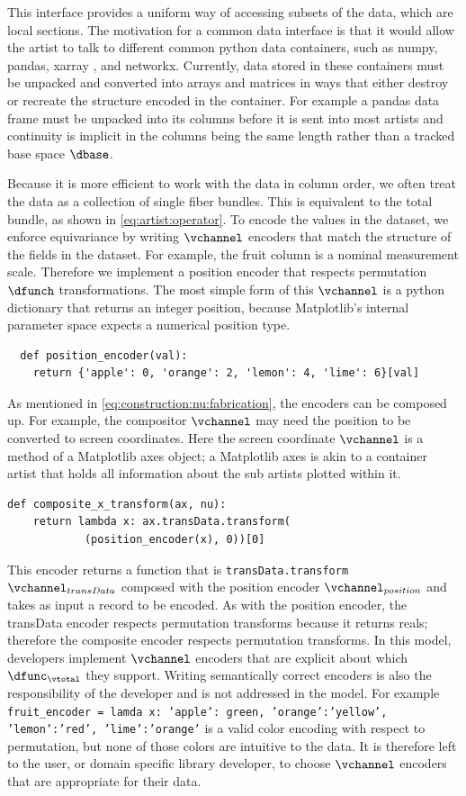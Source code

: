 \documentclass[10pt,journal,compsoc]{IEEEtran}
\theoremstyle{definition}
\theoremstyle{remark}
\begin{document}
This interface provides a uniform way of accessing subsets of the data, which are local sections. The motivation for a common data interface is that it would allow the artist to talk to different common python data containers, such as numpy\cite{harris2020array}, pandas\cite{jeff_reback_2020_3715232}, xarray \cite{hoyer2017xarray}, and networkx\cite{HagbergExploringNetwork2008}. Currently, data stored in these containers must be unpacked and converted into arrays and matrices in ways that either destroy or recreate the structure encoded in the container. For example a pandas data frame must be unpacked into its columns before it is sent into most artists and continuity is implicit in the columns being the same length rather than a tracked base space $\dbase$.

Because it is more efficient to work with the data in column order, we often treat the data as a collection of single fiber bundles. This is equivalent to the total bundle, as shown in \autoref{eq:artist:operator}. To encode the values in the dataset, we enforce equivariance by writing $\vchannel$ encoders that match the structure of the fields in the dataset. For example, the fruit column is a nominal measurement scale. Therefore we implement a position encoder that respects permutation $\dfunch$ transformations. The most simple form of this $\vchannel$ is a python dictionary that returns an integer position, because Matplotlib's internal parameter space expects a numerical position type. 
\begin{verbatim}
  def position_encoder(val):
    return {'apple': 0, 'orange': 2, 'lemon': 4, 'lime': 6}[val]
\end{verbatim}
As mentioned in \autoref{eq:construction:nu:fabrication}, the encoders can be composed up. For example, the compositor $\vchannel$ may need the position to be converted to screen coordinates. Here the screen coordinate $\vchannel$ is a method of a Matplotlib axes object; a Matplotlib axes is akin to a container artist that holds all information about the sub artists plotted within it. 
\begin{verbatim}
def composite_x_transform(ax, nu):
    return lambda x: ax.transData.transform(
            (position_encoder(x), 0))[0]
\end{verbatim}
This encoder returns a function that is \texttt{transData.transform} $\vchannel_{transData}$ composed with the position encoder $\vchannel_{position}$ and takes as input a record to be encoded. As with the position encoder, the transData encoder respects permutation transforms because it returns reals; therefore the composite encoder respects permutation transforms. In this model, developers implement $\vchannel$ encoders that are explicit about which $\dfunc_{\vtotal}$ they support. Writing semantically correct encoders is also the responsibility of the developer and is not addressed in the model. For example \texttt{fruit_encoder = lamda x: {'apple': green, 'orange':'yellow', 'lemon':'red', 'lime':'orange'}} is a valid color encoding with respect to permutation, but none of those colors are intuitive to the data. It is therefore left to the user, or domain specific library developer, to choose $\vchannel$ encoders that are appropriate for their data.
\end{document}
